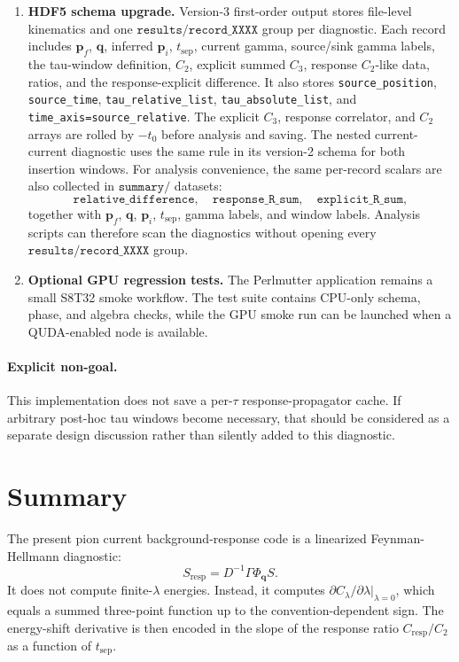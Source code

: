 \documentclass[11pt,a4paper]{article}
\newcommand{\Dslash}{D}
\newcommand{\Sresp}{S_{\mathrm{resp}}}
\newcommand{\Ctwo}{C_2}
\newcommand{\Cresp}{C_{\mathrm{resp}}}
\begin{document}
\begin{enumerate}[label=\arabic*.]
  \item \textbf{HDF5 schema upgrade.}
  Version-3 first-order output stores file-level kinematics and one
  \(\texttt{results/record\_XXXX}\) group per diagnostic.  Each record includes
  \(\mathbf p_f\), \(\mathbf q\), inferred \(\mathbf p_i\), \(t_{\mathrm{sep}}\),
  current gamma, source/sink gamma labels, the tau-window definition, \(C_2\),
  explicit summed \(C_3\), response \(C_2\)-like data, ratios, and the
  response-explicit difference.  It also stores
  \texttt{source\_position}, \texttt{source\_time},
  \texttt{tau\_relative\_list}, \texttt{tau\_absolute\_list}, and
  \texttt{time\_axis=source\_relative}.  The explicit \(C_3\), response
  correlator, and \(C_2\) arrays are rolled by \(-t_0\) before analysis and
  saving.  The nested current-current diagnostic uses the same rule in its
  version-2 schema for both insertion windows.
  For analysis convenience, the same per-record scalars are also collected in
  \(\texttt{summary/}\) datasets:
  \[
    \texttt{relative\_difference},\quad
    \texttt{response\_R\_sum},\quad
    \texttt{explicit\_R\_sum},
  \]
  together with \(\mathbf p_f\), \(\mathbf q\), \(\mathbf p_i\),
  \(t_{\mathrm{sep}}\), gamma labels, and window labels.  Analysis scripts can
  therefore scan the diagnostics without opening every
  \(\texttt{results/record\_XXXX}\) group.

  \item \textbf{Optional GPU regression tests.}
  The Perlmutter application remains a small S8T32 smoke workflow.  The test
  suite contains CPU-only schema, phase, and algebra checks, while the GPU
  smoke run can be launched when a QUDA-enabled node is available.
\end{enumerate}

\paragraph{Explicit non-goal.}
This implementation does not save a per-\(\tau\) response-propagator cache.
If arbitrary post-hoc tau windows become necessary, that should be considered
as a separate design discussion rather than silently added to this diagnostic.

\section{Summary}

The present pion current background-response code is a linearized
Feynman-Hellmann diagnostic:
\begin{equation}
  \Sresp=\Dslash^{-1}\Gamma\Phi_{\mathbf q}S.
\end{equation}
It does not compute finite-\(\lambda\) energies.  Instead, it computes
\(\partial C_\lambda/\partial\lambda|_{\lambda=0}\), which equals a summed
three-point function up to the convention-dependent sign.  The energy-shift
derivative is then encoded in the slope of the response ratio
\(\Cresp/\Ctwo\) as a function of \(t_{\mathrm{sep}}\).
\end{document}
